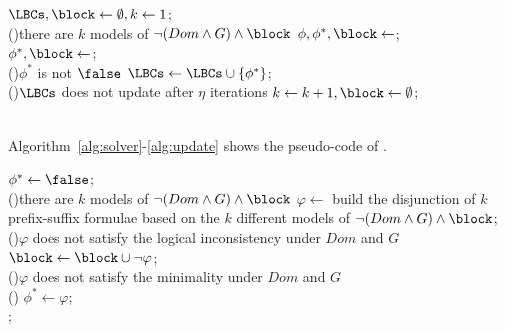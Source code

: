 \begin{algorithm}[h]
    \caption{\identifier}\label{alg:solver}

    $\LBCs,\block \gets \emptyset, k \gets 1$;\\
    \While(){there are $k$ models of $\lnot (Dom \land G) \land \block$}{
        $\phi,\phi^*,\block \gets$;\\
        $\phi^*,\block \gets$;\\
        \If(){$\phi^*$ is not $\false$}{
            $\LBCs \gets \LBCs \cup \{ \phi^* \}$;\\
        }
        \If(){$\LBCs$ does not update after $\eta$ iterations}{
            $k \gets k + 1,\block \gets \emptyset$;\\
        }
    }
    \Return{$\LBCs$}\\
\end{algorithm}

Algorithm~\ref{alg:solver}-\ref{alg:update} shows the pseudo-code of \identifier. 




\begin{algorithm}[h]
    \caption{}\label{alg:initialize}
    $\phi^* \gets \false$;\\
    \While(){there are $k$ models of $\lnot (Dom \land G) \land \block$}{
        $\varphi \gets$ build the disjunction of $k$ prefix-suffix formulae based on the $k$ different models of $\lnot (Dom \land G) \land \block$;\\
        \If(){$\varphi$ does not satisfy the logical inconsistency under $Dom$ and $G$}{
            $\block \gets \block \cup \lnot \varphi$;\\
        }
        \ElseIf(){$\varphi$ does not satisfy the minimality under $Dom$ and $G$}{
            \Return{$\varphi,\phi^*,\block$}\\
        }
        \Else(){
            $\phi^* \gets \varphi$;\\
            \Return{$\varphi,\phi^*,\block$};\\
        }
    }
\end{algorithm}


